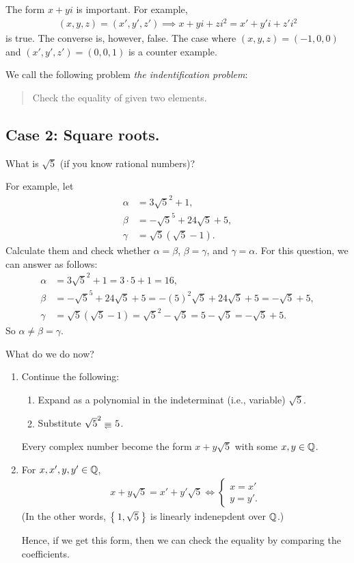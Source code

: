\begin{remark}
  The form $x+yi$ is important.
  For example,
  \begin{align*}
  (x,y,z)=(x', y',z') \implies x+yi+zi^2=x'+y'i+z'i^2  
  \end{align*}
  is true. The converse is, however, false.
  The case where $(x,y,z)=(-1,0,0)$ and $(x',y',z')=(0,0,1)$
  is a counter example.
\end{remark}

\begin{remark}
  We call the following problem \emph{the indentification problem}:
  \begin{quotation}
    Check the equality of given two elements.
  \end{quotation}
\end{remark}


\subsection{Case 2: Square roots.}
What is $\sqrt{5}$ (if you know rational numbers)?

For example, let
\begin{align*}
  \alpha &= 3\sqrt{5}^2 + 1,\\
  \beta &= -\sqrt{5}^5 + 24\sqrt{5}+5,\\
  \gamma &= \sqrt{5}(\sqrt{5} - 1).
\end{align*}
Calculate them and check whether $\alpha=\beta$, $\beta=\gamma$,
and $\gamma=\alpha$.
For this question, we can answer as follows:
\begin{align*}
  \alpha &= 3\sqrt{5}^2 + 1=3\cdot 5+1=16,\\
  \beta &= -\sqrt{5}^5 + 24\sqrt{5}+5=-(5)^2\sqrt{5}+24\sqrt{5}+5=-\sqrt{5}+5,\\
  \gamma &= \sqrt{5}(\sqrt{5} - 1)=\sqrt{5}^2-\sqrt{5}=5-\sqrt{5}=-\sqrt{5}+5.
\end{align*}
So $\alpha\neq \beta=\gamma$.

What do we do now?
\begin{enumerate}
\item Continue the following:
  \begin{enumerate}
  \item Expand as a polynomial in the indeterminat (i.e., variable) $\sqrt{5}$.
  \item Substitute $\sqrt{5}^2\denotes 5$.
  \end{enumerate}
  Every complex number become the form $x+y\sqrt{5}$
  with some $x,y\in\mathbb{Q}$.
\item For $x,x',y,y'\in\mathbb{Q}$,
  \begin{align*}
      x+y\sqrt{5}=x'+y'\sqrt{5} \iff \begin{cases}x=x'\\y=y'.\end{cases}
  \end{align*}
  (In the other words,
  $\Set{1,\sqrt{5}}$ is linearly indenepdent over $\mathbb{Q}$.)

  Hence, if we get this form, then we can check the equality by
  comparing the coefficients.
\end{enumerate}



